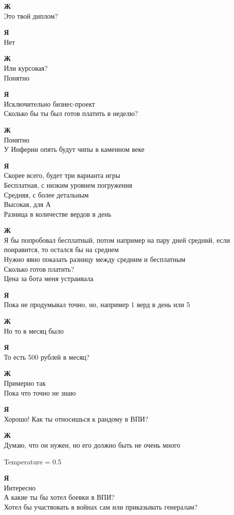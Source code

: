 \textbf{Ж}\\
Это твой диплом?

\textbf{Я}\\
Нет

\textbf{Ж}\\
Или курсовая?\\
Понятно

\textbf{Я}\\
Исключительно бизнес-проект\\
Сколько бы ты был готов платить в неделю?

\textbf{Ж}\\
Понятно\\
У Инферии опять будут чипы в каменном веке

\textbf{Я}\\
Скорее всего, будет три варианта игры\\
Бесплатная, с низким уровнем погружения\\
Средняя, с более детальным\\
Высокая, для А\\
Разница в количестве вердов в день

\textbf{Ж}\\
Я бы попробовал бесплатный, потом например на пару дней средний, если понравится, то остался бы на среднем\\
Нужно явно показать разницу между средним и бесплатным\\
Сколько готов платить?\\
Цена за бота меня устраивала

\textbf{Я}\\
Пока не продумывал точно, но, например 1 верд в день или 5

\textbf{Ж}\\
Но то в месяц было

\textbf{Я}\\
То есть 500 рублей в месяц?

\textbf{Ж}\\
Примерно так\\
Пока что точно не знаю

\textbf{Я}\\
Хорошо! Как ты относишься к рандому в ВПИ?

\textbf{Ж}\\
Думаю, что он нужен, но его должно быть не очень много

Temperature = 0.5

\textbf{Я}\\
Интересно\\
А какие ты бы хотел боевки в ВПИ?\\
Хотел бы участвовать в войнах сам или приказывать генералам?\\

